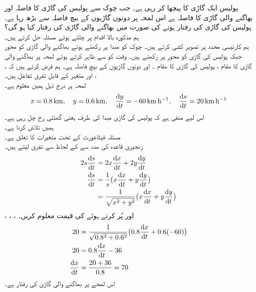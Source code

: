 %
پولیس ایک گاڑی کا پیچھا کر رہی ہے۔ جب چوک سے پولیس کی گاڑی کا فاصلہ  اور  بھاگنے والی گاڑی کا فاصلہ  ہے  اس لمحہ پر دونوں گاڑیوں کے بیچ فاصلہ  سے بڑھ رہا ہے۔پولیس کی گاڑی کی رفتار  ہونے کی صورت میں بھاگنے والی گاڑی کی رفتار کیا ہو گی؟\\
ہم مذکورہ بالا اقدام پر چلتے ہوئے مسئلہ حل کرتے ہیں۔\\
\quad
{} ہم کارتیسی محدد پر تصویر کشی کرتے ہیں۔ چوک کو مبدا پر رکھتے ہوئے بھاگنے والی گاڑی کو محور  جبکہ پولیس کی گاڑی کو محور  پر رکھتے ہیں۔ وقت کو  سے ظاہر کرتے ہوئے لمحہ  پر بھاگنے والی گاڑی کا مقام ، پولیس کی گاڑی کا مقام ۔  اور دونوں گاڑیوں کے بیچ فاصلہ  ہے۔ ہم فرض کرتے ہیں کہ ، ، اور  متغیر  کے قابل تفرق تفاعل ہیں۔\\
\quad
{} لمحہ  پر درج ذیل ہمیں معلوم ہے۔
\begin{align*}
x=\SI{0.8}{\kilo\meter},\quad y=\SI{0.6}{\kilo\meter},\quad \frac{\dif y}{\dif t}=\SI{-60}{\kilo\meter\per\hour},\quad \frac{\dif s}{\dif t}=\SI{20}{\kilo\meter\per\hour}
\end{align*}  
 اس لیے منفی ہے کہ پولیس کی گاڑی مبدا کی طرف یعنی گھٹتی   رخ چل رہی ہے۔\\
\quad
ہمیں  تلاش کرنا ہے۔\\
\quad
مسئلہ فیثاغورث کے تحت متغیرات کا تعلق  ہے۔\\
\quad
زنجیری قاعدہ کی مدد سے  کے لحاظ سے تفرق لیتے ہیں۔
\begin{align*}
2s\frac{\dif s}{\dif t}&=2x\frac{\dif x}{\dif t}+2y\frac{\dif y}{\dif t}\\
\frac{\dif s}{\dif t}&=\frac{1}{s}\big(x\frac{\dif x}{\dif t}+y\frac{\dif y}{\dif t}\big)\\
&=\frac{1}{\sqrt{x^2+y^2}}\big(x\frac{\dif x}{\dif t}+y\frac{\dif y}{\dif t}\big)
\end{align*}
\quad
{}، ، ، اور  پُر کرتے ہوئے  کی قیمت معلوم کریں۔
\begin{align*}
20&=\frac{1}{\sqrt{0.8^2+0.6^2}}\big(0.8\frac{\dif x}{\dif t}+0.6(-60)\big)\\
20&=0.8\frac{\dif x}{\dif t}-36\\
\frac{\dif x}{\dif t}&=\frac{20+36}{0.8}=70
\end{align*}
اس لمحے  پر بھاگنے والی گاڑی کی رفتار  ہے۔ 

